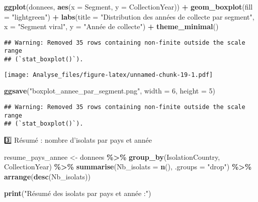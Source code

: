 \documentclass[
]{article}
\newenvironment{Shaded}{\begin{snugshade}}{\end{snugshade}}
\newcommand{\AttributeTok}[1]{\textcolor[rgb]{0.13,0.29,0.53}{#1}}
\newcommand{\DecValTok}[1]{\textcolor[rgb]{0.00,0.00,0.81}{#1}}
\newcommand{\FunctionTok}[1]{\textcolor[rgb]{0.13,0.29,0.53}{\textbf{#1}}}
\newcommand{\NormalTok}[1]{#1}
\newcommand{\OtherTok}[1]{\textcolor[rgb]{0.56,0.35,0.01}{#1}}
\newcommand{\SpecialCharTok}[1]{\textcolor[rgb]{0.81,0.36,0.00}{\textbf{#1}}}
\newcommand{\StringTok}[1]{\textcolor[rgb]{0.31,0.60,0.02}{#1}}
\begin{document}
\begin{Shaded}
\begin{Highlighting}[]
\FunctionTok{ggplot}\NormalTok{(donnees, }\FunctionTok{aes}\NormalTok{(}\AttributeTok{x =}\NormalTok{ Segment, }\AttributeTok{y =}\NormalTok{ CollectionYear)) }\SpecialCharTok{+}
  \FunctionTok{geom\_boxplot}\NormalTok{(}\AttributeTok{fill =} \StringTok{"lightgreen"}\NormalTok{) }\SpecialCharTok{+}
  \FunctionTok{labs}\NormalTok{(}\AttributeTok{title =} \StringTok{"Distribution des années de collecte par segment"}\NormalTok{,}
       \AttributeTok{x =} \StringTok{"Segment viral"}\NormalTok{,}
       \AttributeTok{y =} \StringTok{"Année de collecte"}\NormalTok{) }\SpecialCharTok{+}
  \FunctionTok{theme\_minimal}\NormalTok{()}
\end{Highlighting}
\end{Shaded}

\begin{verbatim}
## Warning: Removed 35 rows containing non-finite outside the scale range
## (`stat_boxplot()`).
\end{verbatim}

\texttt{[image: Analyse\_files/figure-latex/unnamed-chunk-19-1.pdf]}

\begin{Shaded}
\begin{Highlighting}[]
\FunctionTok{ggsave}\NormalTok{(}\StringTok{"boxplot\_annee\_par\_segment.png"}\NormalTok{, }\AttributeTok{width =} \DecValTok{6}\NormalTok{, }\AttributeTok{height =} \DecValTok{5}\NormalTok{)}
\end{Highlighting}
\end{Shaded}

\begin{verbatim}
## Warning: Removed 35 rows containing non-finite outside the scale range
## (`stat_boxplot()`).
\end{verbatim}

3️⃣ Résumé : nombre d'isolats par pays et année

\begin{Shaded}
\begin{Highlighting}[]
\NormalTok{resume\_pays\_annee }\OtherTok{\textless{}{-}}\NormalTok{ donnees }\SpecialCharTok{\%\textgreater{}\%}
  \FunctionTok{group\_by}\NormalTok{(IsolationCountry, CollectionYear) }\SpecialCharTok{\%\textgreater{}\%}
  \FunctionTok{summarise}\NormalTok{(}\AttributeTok{Nb\_isolats =} \FunctionTok{n}\NormalTok{(), }\AttributeTok{.groups =} \StringTok{"drop"}\NormalTok{) }\SpecialCharTok{\%\textgreater{}\%}
  \FunctionTok{arrange}\NormalTok{(}\FunctionTok{desc}\NormalTok{(Nb\_isolats))}

\FunctionTok{print}\NormalTok{(}\StringTok{"Résumé des isolats par pays et année :"}\NormalTok{)}
\end{Highlighting}
\end{Shaded}
\end{document}
